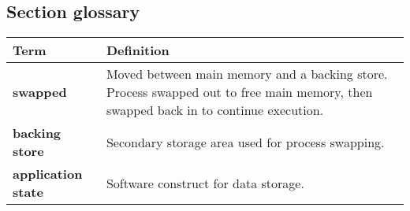 \subsection*{Section glossary}
\begin{tabular}{p{}p{}}
    \toprule
    \textbf{Term} & \textbf{Definition} \\
    \midrule
    \textbf{swapped} & Moved between main memory and a backing store. Process swapped out to free main memory, then swapped back in to continue execution. \\
    \textbf{backing store} & Secondary storage area used for process swapping. \\
    \textbf{application state} & Software construct for data storage. \\
    \bottomrule
\end{tabular}
